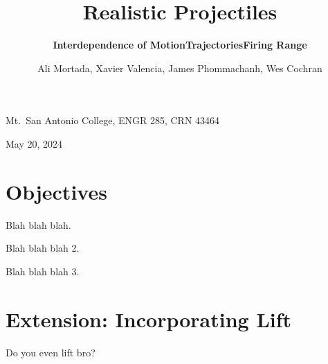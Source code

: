 \documentclass[12pt]{iopart} %
\begin{document}
\title{Realistic Projectiles}
\author{Ali Mortada, Xavier Valencia, James Phommachanh, Wes Cochran}
\vspace{10pt}
\begin{indented}
  \item[]Mt.~San Antonio College, ENGR 285, CRN 43464
  \item[]May 20, 2024
\end{indented}
\newpage

\section{Objectives}

\begin{center}
\subtitle{\textbf{Interdependence of Motion}}
\end{center}

Blah blah blah.



\pagebreak

\begin{center}
\subtitle{\textbf{Trajectories}}
\end{center}

Blah blah blah 2.

\pagebreak

\begin{center}
\subtitle{\textbf{Firing Range}}
\end{center}

Blah blah blah 3.


\pagebreak

\section{Extension: Incorporating Lift}

Do you even lift bro?
\end{document}
